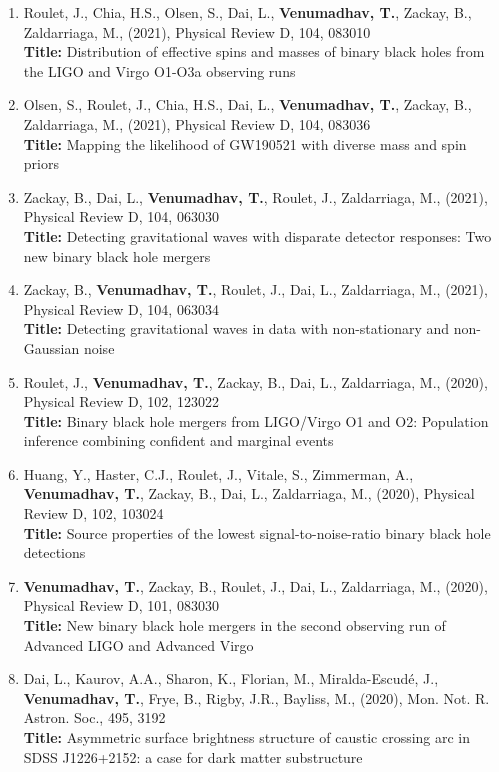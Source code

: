 \documentclass{article}
\newcommand{\mnras}{Mon. Not. R. Astron. Soc.}
\newcommand{\prd}{Physical Review D}
\begin{document}
{\begin{enumerate}[leftmargin=*,itemsep=0.45em,topsep=0.35em]
\textbf{Title:} Signs of higher multipoles and orbital precession in GW151226
\item Roulet, J., Chia, H.S., Olsen, S., Dai, L., \textbf{Venumadhav, T.}, Zackay, B., Zaldarriaga, M., (2021), \prd, 104, 083010 \\
\textbf{Title:} Distribution of effective spins and masses of binary black holes from the LIGO and Virgo O1-O3a observing runs
\item Olsen, S., Roulet, J., Chia, H.S., Dai, L., \textbf{Venumadhav, T.}, Zackay, B., Zaldarriaga, M., (2021), \prd, 104, 083036 \\
\textbf{Title:} Mapping the likelihood of GW190521 with diverse mass and spin priors
\item Zackay, B., Dai, L., \textbf{Venumadhav, T.}, Roulet, J., Zaldarriaga, M., (2021), \prd, 104, 063030 \\
\textbf{Title:} Detecting gravitational waves with disparate detector responses: Two new binary black hole mergers
\item Zackay, B., \textbf{Venumadhav, T.}, Roulet, J., Dai, L., Zaldarriaga, M., (2021), \prd, 104, 063034 \\
\textbf{Title:} Detecting gravitational waves in data with non-stationary and non-Gaussian noise
\item Roulet, J., \textbf{Venumadhav, T.}, Zackay, B., Dai, L., Zaldarriaga, M., (2020), \prd, 102, 123022 \\
\textbf{Title:} Binary black hole mergers from LIGO/Virgo O1 and O2: Population inference combining confident and marginal events
\item Huang, Y., Haster, C.J., Roulet, J., Vitale, S., Zimmerman, A., \textbf{Venumadhav, T.}, Zackay, B., Dai, L., Zaldarriaga, M., (2020), \prd, 102, 103024 \\
\textbf{Title:} Source properties of the lowest signal-to-noise-ratio binary black hole detections
\item \textbf{Venumadhav, T.}, Zackay, B., Roulet, J., Dai, L., Zaldarriaga, M., (2020), \prd, 101, 083030 \\
\textbf{Title:} New binary black hole mergers in the second observing run of Advanced LIGO and Advanced Virgo
\item Dai, L., Kaurov, A.A., Sharon, K., Florian, M., Miralda-Escudé, J., \textbf{Venumadhav, T.}, Frye, B., Rigby, J.R., Bayliss, M., (2020), \mnras, 495, 3192 \\
\textbf{Title:} Asymmetric surface brightness structure of caustic crossing arc in SDSS J1226+2152: a case for dark matter substructure

\end{enumerate}}
\end{document}
